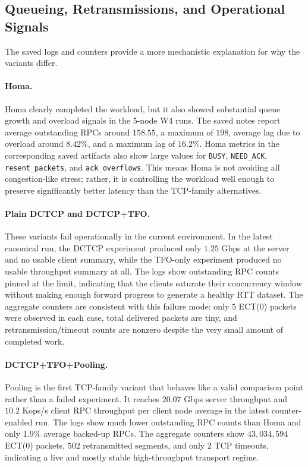 \documentclass[11pt]{article}
\begin{document}
\subsection{Queueing, Retransmissions, and Operational Signals}

The saved logs and counters provide a more mechanistic explanation for why the variants differ.

\paragraph{Homa.}
Homa clearly completed the workload, but it also showed substantial queue growth and overload signals in the 5-node W4 runs. The saved notes report average outstanding RPCs around \(158.55\), a maximum of \(198\), average lag due to overload around \(8.42\%\), and a maximum lag of \(16.2\%\). Homa metrics in the corresponding saved artifacts also show large values for \texttt{BUSY}, \texttt{NEED\_ACK}, \texttt{resent\_packets}, and \texttt{ack\_overflows}. This means Homa is not avoiding all congestion-like stress; rather, it is controlling the workload well enough to preserve significantly better latency than the TCP-family alternatives.

\paragraph{Plain DCTCP and DCTCP+TFO.}
These variants fail operationally in the current environment. In the latest canonical run, the DCTCP experiment produced only \(1.25\) Gbps at the server and no usable client summary, while the TFO-only experiment produced no usable throughput summary at all. The logs show outstanding RPC counts pinned at the limit, indicating that the clients saturate their concurrency window without making enough forward progress to generate a healthy RTT dataset. The aggregate counters are consistent with this failure mode: only \(5\) ECT(0) packets were observed in each case, total delivered packets are tiny, and retransmission/timeout counts are nonzero despite the very small amount of completed work.

\paragraph{DCTCP+TFO+Pooling.}
Pooling is the first TCP-family variant that behaves like a valid comparison point rather than a failed experiment. It reaches \(20.07\) Gbps server throughput and \(10.2\) Kops/s client RPC throughput per client node average in the latest counter-enabled run. The logs show much lower outstanding RPC counts than Homa and only \(1.9\%\) average backed-up RPCs. The aggregate counters show \(43{,}034{,}594\) ECT(0) packets, \(502\) retransmitted segments, and only \(2\) TCP timeouts, indicating a live and mostly stable high-throughput transport regime.
\end{document}
